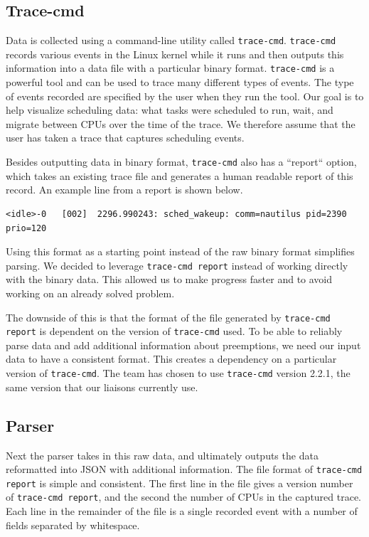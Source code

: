 \documentclass{hmcclinic}
\begin{document}
  \subsection{Trace-cmd}

  Data is collected using a command-line utility called \texttt{trace-cmd}.
  \texttt{trace-cmd} records various events in the Linux kernel while it runs and then
  outputs this information into a data file with a particular binary format.
  \texttt{trace-cmd} is a powerful tool and can be used to trace many different types of
  events. The type of events recorded are specified by the user when they run
  the tool. Our goal is to help visualize scheduling data: what tasks were
  scheduled to run, wait, and migrate between CPUs over the time of the trace.
  We therefore assume that the user has taken a trace that captures scheduling
  events.

  Besides outputting data in binary format, \texttt{trace-cmd} also has a ``report``
  option, which takes an existing trace file and generates a human readable
  report of this record. An example line from a report is shown below.
  
\footnotesize\begin{verbatim}<idle>-0   [002]  2296.990243: sched_wakeup: comm=nautilus pid=2390 prio=120\end{verbatim}

\normalsize
  Using this format as a starting point instead of the
  raw binary format simplifies parsing.  We decided to leverage
  \texttt{trace-cmd report}
  instead of working directly with the binary data. This allowed us to make
  progress faster and to avoid working on an already solved problem.

  The downside of this is that the format of the file generated by \texttt{trace-cmd
  report} is dependent on the version of \texttt{trace-cmd} used. To be able to reliably
  parse data and add additional information about preemptions, we need our input
  data to have a consistent format. This creates a dependency on a particular
  version of \texttt{trace-cmd}. The team has chosen to use \texttt{trace-cmd} version 2.2.1, 
  the same version that our liaisons currently use.

  \subsection{Parser}
  Next the parser takes in this raw data, and ultimately outputs the data
  reformatted into JSON with additional information. The file format of
  \texttt{trace-cmd report} is simple and consistent. The first line in the file
  gives a version number of \texttt{trace-cmd report}, and the second the number of
  CPUs in the captured trace. Each line in the remainder of the file is a
  single recorded event with a number of fields separated by whitespace.
   
\end{document}
